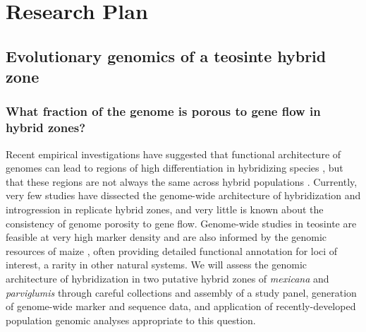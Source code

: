 \section*{Research Plan}

\subsection{Evolutionary genomics of a teosinte hybrid zone}
\label{ss:hybrids}
\subsubsection{What fraction of the genome is porous to gene flow in hybrid zones?}
\label{sss:genomescan}
Recent empirical investigations have suggested that functional architecture of genomes can lead to regions of high differentiation in hybridizing species \citep{renaut2013}, but that these regions are not always the same across hybrid populations \citep{Parchman2013}.  
Currently, very few studies have dissected the genome-wide architecture of hybridization and introgression in replicate hybrid zones, and very little is known about the consistency of genome porosity to gene flow. Genome-wide studies in teosinte are feasible at very high marker density \citep{Hufford2012b, Hufford2013, Pyhajarvi2013} and are also informed by the genomic resources of maize \citep{Hufford2012}, often providing detailed functional annotation for loci of interest, a rarity in other natural systems.  We will assess the genomic architecture of hybridization in two putative hybrid zones of \emph{mexicana} and \emph{parviglumis} through careful collections and assembly of a study panel, generation of genome-wide marker and sequence data, and application of recently-developed population genomic analyses appropriate to this question. 

